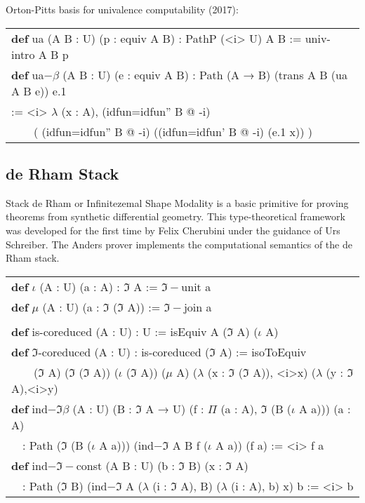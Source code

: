 \documentclass[a4paper,UKenglish,cleveref, autoref, thm-restate]{lipics-v2021}
\newcommand{\tabstyle}[0]{\scriptsize\ttfamily\fontseries{l}\selectfont}
\begin{document}
Orton-Pitts basis for univalence computability (2017):

\begin{table}[ht!]
\tabstyle
\begin{tabular}{l}
\textbf{def} ua (A B : U) (p : equiv A B) : PathP (<i> U) A B := univ-intro A B p \\
\textbf{def} ua$-\beta$ (A B : U) (e : equiv A B) : Path (A → B) (trans A B (ua A B e)) e.1 \\
 := <i> $\lambda$ (x : A), (idfun=idfun'' B @ -i) \\
\ \ \ \ ( (idfun=idfun'' B @ -i) ((idfun=idfun' B @ -i) (e.1 x)) ) \\
\end{tabular}
\end{table}

\newpage
\subsection{de Rham Stack}

Stack de Rham or Infinitezemal Shape Modality is a basic primitive for proving theorems
from synthetic differential geometry. This type-theoretical framework was developed
for the first time by Felix Cherubini under the guidance of Urs Schreiber. The Anders
prover implements the computational semantics of the de Rham stack.

\begin{table}[ht]
\tabstyle
\begin{tabular}{l}
\textbf{def} $\iota$ (A : U) (a : A) : $\Im$ A := $\Im-$unit a \\
\textbf{def} $\mu$ (A : U) (a : $\Im$ ($\Im$ A)) := $\Im-$join a \\
\\
\textbf{def} is-coreduced (A : U) : U := isEquiv A ($\Im$ A) ($\iota$ A) \\
\textbf{def} $\Im$-coreduced (A : U) : is-coreduced ($\Im$ A) := isoToEquiv \\
\ \ \ \ ($\Im$ A) ($\Im$ ($\Im$ A)) ($\iota$ ($\Im$ A)) ($\mu$ A) ($\lambda$ (x : $\Im$ ($\Im$ A)), <i>x) ($\lambda$ (y : $\Im$ A),<i>y) \\
\textbf{def} ind$-\Im\beta$ (A : U) (B : $\Im$ A → U) (f : $\Pi$ (a : A), $\Im$ (B ($\iota$ A a))) (a : A) \\
\ \ : Path ($\Im$ (B ($\iota$ A a))) (ind$-\Im$ A B f ($\iota$ A a)) (f a) := <i> f a \\
\textbf{def} ind$-\Im-$const (A B : U) (b : $\Im$ B) (x : $\Im$ A) \\
\ \ : Path ($\Im$ B) (ind$-\Im$ A ($\lambda$ (i : $\Im$ A), B) ($\lambda$ (i : A), b) x) b := <i> b \\
\end{tabular}
\end{table}
\end{document}
